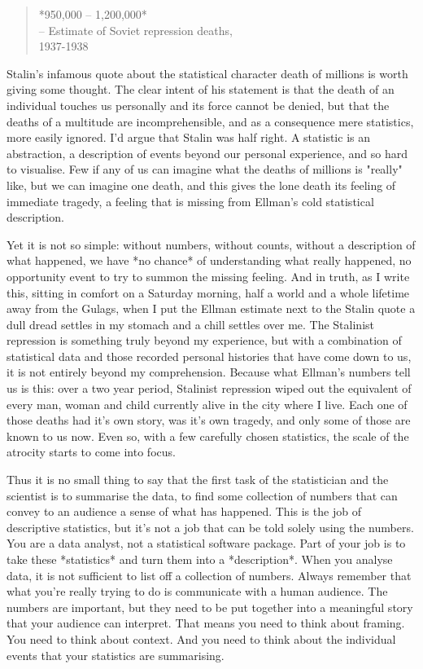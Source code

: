 \begin{quote}
*950,000 -- 1,200,000* \\
\hspace*{2cm} -- Estimate of Soviet repression deaths, \\ \hspace*{2.3cm} 1937-1938 \cite{Ellman2002}
\end{quote}


Stalin's infamous quote about the statistical character death of millions is worth giving some thought. The clear intent of his statement is that the death of an individual touches us personally and its force cannot be denied, but that the deaths of a multitude are incomprehensible, and as a consequence mere statistics, more easily ignored. I'd argue that Stalin was half right. A statistic is an abstraction, a description of events beyond our personal experience, and so hard to visualise. Few if any of us can imagine what the deaths of millions is "really" like, but we can imagine one death, and this gives the lone death its feeling of immediate tragedy, a feeling that is missing from Ellman's cold statistical description.

Yet it is not so simple: without numbers, without counts, without a description of what happened, we have *no chance* of understanding what really happened, no opportunity event to try to summon the missing feeling. And in truth, as I write this, sitting in comfort on a Saturday morning, half a world and a whole lifetime away from the Gulags, when I put the Ellman estimate next to the Stalin quote a dull dread settles in my stomach and a chill settles over me. The Stalinist repression is something truly beyond my experience, but with a combination of statistical data and those recorded personal histories that have come down to us, it is not entirely beyond my comprehension. Because what Ellman's numbers tell us is this: over a two year period, Stalinist repression wiped out the equivalent of every man, woman and child currently alive in the city where I live. Each one of those deaths had it's own story, was it's own tragedy, and only some of those are known to us now. Even so, with a few carefully chosen statistics, the scale of the atrocity starts to come into focus.  

Thus it is no small thing to say that the first task of the statistician and the scientist is to summarise the data, to find some collection of numbers that can convey to an audience a sense of what has happened. This is the job of descriptive statistics, but it's not a job that can be told solely using the numbers. You are a data analyst, not a statistical software package. Part of your job is to take these *statistics* and turn them into a *description*. When you analyse data, it is not sufficient to list off a collection of numbers. Always remember that what you're really trying to do is communicate with a human audience. The numbers are important, but they need to be put together into a meaningful story that your audience can interpret. That means you need to think about framing. You need to think about context. And you need to think about the individual events that your statistics are summarising. 


